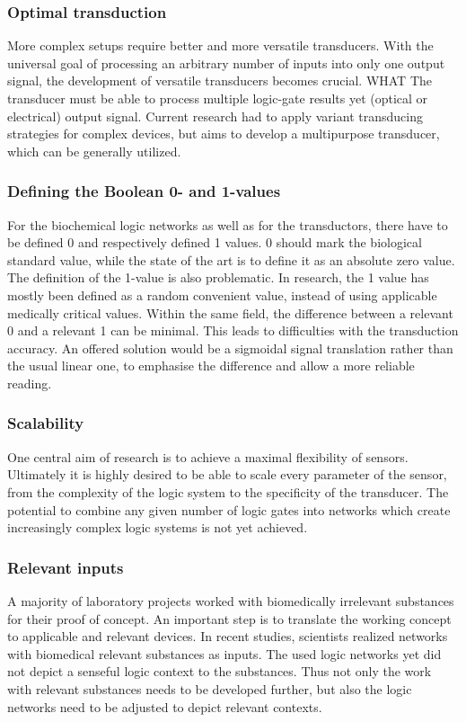 \documentclass[runningheads]{llncs}
\begin{document}
\subsubsection{Optimal transduction} More complex setups require better and more versatile transducers. With the universal goal of processing an arbitrary number of inputs into only one output signal, the development of versatile transducers becomes crucial. WHAT The transducer must be able to process multiple logic-gate results yet (optical or electrical) output signal. Current research had to apply variant transducing strategies for complex devices, but aims to develop a multipurpose transducer, which can be generally utilized.\cite{original}

\subsubsection{Defining the Boolean 0- and 1-values} For the biochemical logic networks as well as for the transductors, there have to be defined 0 and respectively defined 1 values. 0 should mark the biological standard value, while the state of the art is to define it as an absolute zero value. The definition of the 1-value is also problematic. In research, the 1 value has mostly been defined as a random convenient value, instead of using applicable medically critical values. Within the same field, the difference between a relevant 0 and a relevant 1 can be minimal. This leads to difficulties with the transduction accuracy. An offered solution would be a sigmoidal signal translation rather than the usual linear one, to emphasise the difference and allow a more reliable reading.\cite{original}

\subsubsection{Scalability}	One central aim of research is to achieve a maximal flexibility of sensors. Ultimately it is highly desired to be able to scale every parameter of the sensor, from the complexity of the logic system to the specificity of the transducer. The potential to combine any given number of logic gates into networks which create increasingly complex logic systems is not yet achieved.\cite{original}

\subsubsection{Relevant inputs}	A majority of laboratory projects worked with biomedically irrelevant substances for their proof of concept. An important step is to translate the working concept to applicable and relevant devices. In recent studies, scientists realized networks with biomedical relevant substances as inputs. The used logic networks yet did not depict a senseful logic context to the substances. Thus not only the work with relevant substances needs to be developed further, but also the logic networks need to be adjusted to depict relevant contexts.\cite{original}
\end{document}
